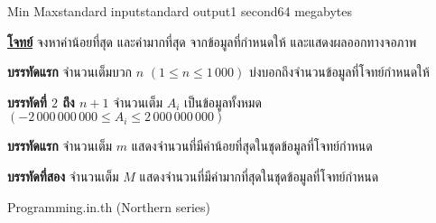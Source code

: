 \documentclass[11pt,a4paper]{article}
\begin{document}
\begin{problem}{Min Max}{standard input}{standard output}{1 second}{64 megabytes}

\underline{\textbf{โจทย์}} จงหาค่าน้อยที่สุด และค่ามากที่สุด จากข้อมูลที่กำหนดให้ และแสดงผลออกทางจอภาพ

\InputFile

\textbf{บรรทัดแรก} จำนวนเต็มบวก $n$ $(1 \leq n \leq 1\,000)$ บ่งบอกถึงจำนวนข้อมูลที่โจทย์กำหนดให้

\textbf{บรรทัดที่ $2$ ถึง $n+1$} จำนวนเต็ม $A_i$ เป็นข้อมูลทั้งหมด $( -2\,000\,000\,000 \leq A_i \leq 2\,000\,000\,000)$

\OutputFile

\textbf{บรรทัดแรก} จำนวนเต็ม $m$ แสดงจำนวนที่มีค่าน้อยที่สุดในชุดข้อมูลที่โจทย์กำหนด

\textbf{บรรทัดที่สอง} จำนวนเต็ม $M$ แสดงจำนวนที่มีค่ามากที่สุดในชุดข้อมูลที่โจทย์กำหนด

\Examples

\begin{example}
%
\end{example}

\Source

Programming.in.th (Northern series)

\end{problem}
\end{document}
